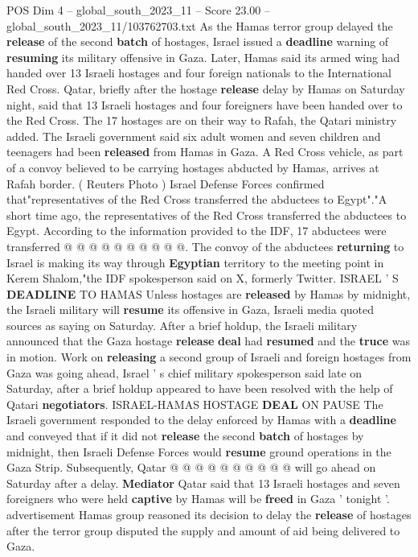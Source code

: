 \begin{textsample}{POS Dim 4 – global\_south\_2023\_11 – Score 23.00 – global\_south\_2023\_11/103762703.txt}  \label{ex:f4_pos_161}
As the Hamas terror group delayed the \textbf{release} of the second \textbf{batch} of hostages, Israel issued a \textbf{deadline} warning of \textbf{resuming} its military offensive in Gaza.
Later, Hamas said its armed wing had handed over 13 Israeli hostages and four foreign nationals to the International Red Cross.
Qatar, briefly after the hostage \textbf{release} delay by Hamas on Saturday night, said that 13 Israeli hostages and four foreigners have been handed over to the Red Cross.
The 17 hostages are on their way to Rafah, the Qatari ministry added.
The Israeli government said six adult women and seven children and teenagers had been \textbf{released} from Hamas in Gaza.
A Red Cross vehicle, as part of a convoy believed to be carrying hostages abducted by Hamas, arrives at Rafah border. ( Reuters Photo ) Israel Defense Forces confirmed that"representatives of the Red Cross transferred the abductees to Egypt"."A short time ago, the representatives of the Red Cross transferred the abductees to Egypt.
According to the information provided to the IDF, 17 abductees were transferred @ @ @ @ @ @ @ @ @ @.
The convoy of the abductees \textbf{returning} to Israel is making its way through \textbf{Egyptian} territory to the meeting point in Kerem Shalom,"the IDF spokesperson said on X, formerly Twitter.
ISRAEL ' S \textbf{DEADLINE} TO HAMAS Unless hostages are \textbf{released} by Hamas by midnight, the Israeli military will \textbf{resume} its offensive in Gaza, Israeli media quoted sources as saying on Saturday.
After a brief holdup, the Israeli military announced that the Gaza hostage \textbf{release} \textbf{deal} had \textbf{resumed} and the \textbf{truce} was in motion.
Work on \textbf{releasing} a second group of Israeli and foreign hostages from Gaza was going ahead, Israel ' s chief military spokesperson said late on Saturday, after a brief holdup appeared to have been resolved with the help of Qatari \textbf{negotiators}.
ISRAEL-HAMAS HOSTAGE \textbf{DEAL} ON PAUSE The Israeli government responded to the delay enforced by Hamas with a \textbf{deadline} and conveyed that if it did not \textbf{release} the second \textbf{batch} of hostages by midnight, then Israeli Defense Forces would \textbf{resume} ground operations in the Gaza Strip.
Subsequently, Qatar @ @ @ @ @ @ @ @ @ @ will go ahead on Saturday after a delay. \textbf{Mediator} Qatar said that 13 Israeli hostages and seven foreigners who were held \textbf{captive} by Hamas will be \textbf{freed} in Gaza ' tonight '. advertisement Hamas group reasoned its decision to delay the \textbf{release} of hostages after the terror group disputed the supply and amount of aid being delivered to Gaza.

\end{textsample}
